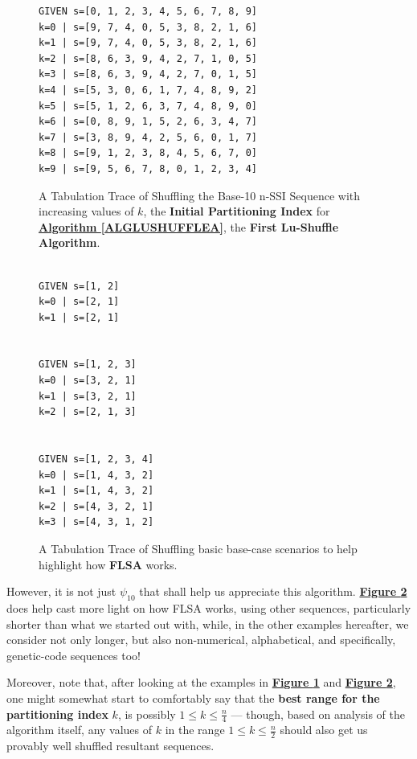 \documentclass[a4paper, 18pt]{book} %
\begin{document}
\begin{figure}[H]
  \begin{center}
\LARGE
\begin{verbatim}
GIVEN s=[0, 1, 2, 3, 4, 5, 6, 7, 8, 9]
k=0 | s=[9, 7, 4, 0, 5, 3, 8, 2, 1, 6]
k=1 | s=[9, 7, 4, 0, 5, 3, 8, 2, 1, 6]
k=2 | s=[8, 6, 3, 9, 4, 2, 7, 1, 0, 5]
k=3 | s=[8, 6, 3, 9, 4, 2, 7, 0, 1, 5]
k=4 | s=[5, 3, 0, 6, 1, 7, 4, 8, 9, 2]
k=5 | s=[5, 1, 2, 6, 3, 7, 4, 8, 9, 0]
k=6 | s=[0, 8, 9, 1, 5, 2, 6, 3, 4, 7]
k=7 | s=[3, 8, 9, 4, 2, 5, 6, 0, 1, 7]
k=8 | s=[9, 1, 2, 3, 8, 4, 5, 6, 7, 0]
k=9 | s=[9, 5, 6, 7, 8, 0, 1, 2, 3, 4]
\end{verbatim}

   \caption{A Tabulation Trace of Shuffling the Base-10 n-SSI Sequence with increasing values of $k$, the \textbf{Initial Partitioning Index} for \textbf{\hyperref[ALGLUSHUFFLEA]{Algorithm \ref{ALGLUSHUFFLEA}}}, the \textbf{First Lu-Shuffle Algorithm}.}
  \label{FIGTRACEFLSA}
  \end{center}
\end{figure}


\begin{figure}[H]
  \begin{center}
\LARGE
\begin{verbatim}

GIVEN s=[1, 2]
k=0 | s=[2, 1]
k=1 | s=[2, 1]


GIVEN s=[1, 2, 3]
k=0 | s=[3, 2, 1]
k=1 | s=[3, 2, 1]
k=2 | s=[2, 1, 3]


GIVEN s=[1, 2, 3, 4]
k=0 | s=[1, 4, 3, 2]
k=1 | s=[1, 4, 3, 2]
k=2 | s=[4, 3, 2, 1]
k=3 | s=[4, 3, 1, 2]
\end{verbatim}

   \caption{A Tabulation Trace of Shuffling basic base-case scenarios to help highlight how \textbf{FLSA} works.}
  \label{FIGTRACEFLSASIMPLE}
  \end{center}
\end{figure}


However, it is not just $\psi_{10}$ that shall help us appreciate this algorithm. \textbf{\hyperref[FIGTRACEFLSASIMPLE]{Figure \ref{FIGTRACEFLSASIMPLE}}} does help cast more light on how FLSA works, using other sequences, particularly shorter than what we started out with, while, in the other examples hereafter, we consider not only longer, but also non-numerical, alphabetical, and specifically, genetic-code sequences too!

Moreover, note that, after looking at the examples in \textbf{\hyperref[FIGTRACEFLSA]{Figure \ref{FIGTRACEFLSA}}} and \textbf{\hyperref[FIGTRACEFLSASIMPLE]{Figure \ref{FIGTRACEFLSASIMPLE}}}, one might somewhat start to comfortably say that the \textbf{best range for the partitioning index} $k$, is possibly $1 \leq k \leq \frac{n}{4}$ --- though, based on analysis of the algorithm itself, any values of $k$ in the range $1 \leq k \leq \frac{n}{2}$ should also get us provably well shuffled resultant sequences.
\end{document}
